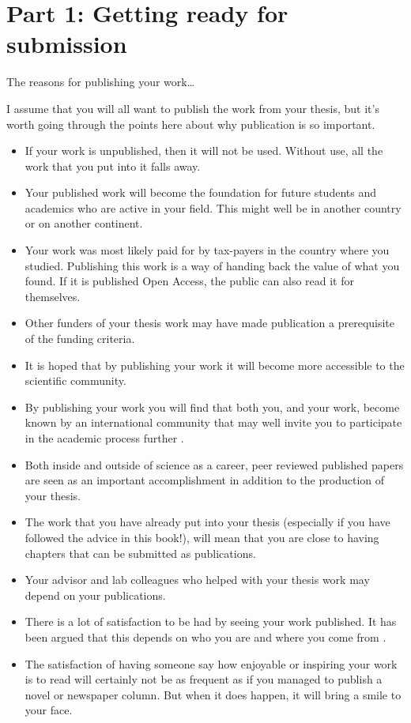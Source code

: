 \documentclass[
]{krantz}
\providecommand{\tightlist}{%
  \setlength{\itemsep}{0pt}\setlength{\parskip}{0pt}}
\begin{document}
\hypertarget{part1}{%
\part{Part 1: Getting ready for submission}\label{part1}}

The reasons for publishing your work\ldots{}

I assume that you will all want to publish the work from your thesis, but it's worth going through the points here about why publication is so important.

\begin{itemize}
\tightlist
\item
  If your work is unpublished, then it will not be used. Without use, all the work that you put into it falls away.
\item
  Your published work will become the foundation for future students and academics who are active in your field. This might well be in another country or on another continent.
\item
  Your work was most likely paid for by tax-payers in the country where you studied. Publishing this work is a way of handing back the value of what you found. If it is published Open Access, the public can also read it for themselves.
\item
  Other funders of your thesis work may have made publication a prerequisite of the funding criteria.
\item
  It is hoped that by publishing your work it will become more accessible to the scientific community.
\item
  By publishing your work you will find that both you, and your work, become known by an international community that may well invite you to participate in the academic process further \citep{marks2013misuse}.
\item
  Both inside and outside of science as a career, peer reviewed published papers are seen as an important accomplishment in addition to the production of your thesis.
\item
  The work that you have already put into your thesis (especially if you have followed the advice in this book!), will mean that you are close to having chapters that can be submitted as publications.
\item
  Your advisor and lab colleagues who helped with your thesis work may depend on your publications.
\item
  There is a lot of satisfaction to be had by seeing your work published. It has been argued that this depends on who you are and where you come from \citep{husemann2017publicationism}.
\item
  The satisfaction of having someone say how enjoyable or inspiring your work is to read will certainly not be as frequent as if you managed to publish a novel or newspaper column. But when it does happen, it will bring a smile to your face.
\end{itemize}
\end{document}
